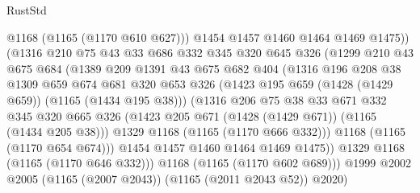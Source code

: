 \begin{lexlean}{RustStd}
\begin{coremodule}
                          @1168
                          (@1165 (@1170 @610 @627)))
                        @1454
                        @1457
                        @1460
                        @1464
                        @1469
                        @1475))
                    (@1316
                      @210
                      @75
                      @43
                      @33
                      @686
                      @332
                      @345
                      @320
                      @645
                      @326
                      (@1299
                        @210
                        @43
                        @675
                        @684
                        (@1389
                          @209
                          @1391
                          @43
                          @675
                          @682
                          @404
                          (@1316
                            @196
                            @208
                            @38
                            @1309
                            @659
                            @674
                            @681
                            @320
                            @653
                            @326
                            (@1423 @195 @659 (@1428 (@1429 @659)) (@1165 (@1434 @195 @38)))
                            (@1316
                              @206
                              @75
                              @38
                              @33
                              @671
                              @332
                              @345
                              @320
                              @665
                              @326
                              (@1423 @205 @671 (@1428 (@1429 @671)) (@1165 (@1434 @205 @38)))
                              @1329
                              @1168
                              (@1165 (@1170 @666 @332)))
                            @1168
                            (@1165 (@1170 @654 @674)))
                          @1454
                          @1457
                          @1460
                          @1464
                          @1469
                          @1475))
                      @1329
                      @1168
                      (@1165 (@1170 @646 @332)))
                    @1168
                    (@1165 (@1170 @602 @689)))
                  @1999
                  @2002
                  @2005
                  (@1165 (@2007 @2043))
                  (@1165 (@2011 @2043 @52))
                  @2020)

\end{coremodule}
\end{lexlean}
